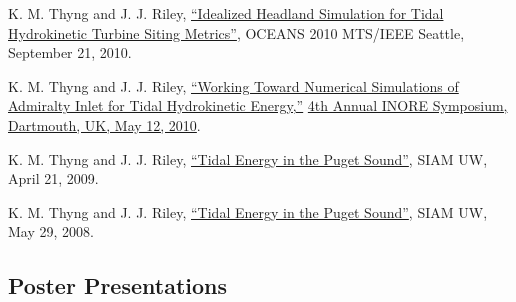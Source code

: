 \documentclass[10pt,letterpaper]{article}
\renewenvironment{itemize}{
  \begin{list}{}{
    \setlength{\leftmargin}{1.5em}
    \setlength{\itemsep}{0.25em}
    \setlength{\parskip}{0pt}
    \setlength{\parsep}{0.25em}
  }
}{
  \end{list}
}
\begin{document}
\begin{itemize}
\item K. M. Thyng and J. J. Riley, \href{http://froude.me.washington.edu/presentations/oceans2010/oceans2010.pdf}{``Idealized Headland Simulation for Tidal Hydrokinetic Turbine Siting Metrics''}, OCEANS 2010 MTS/IEEE Seattle, September 21, 2010.

\item K. M. Thyng and J. J. Riley, \href{http://froude.me.washington.edu/presentations/inore2010/inore2010.pdf}{``Working Toward Numerical Simulations of Admiralty Inlet for Tidal Hydrokinetic Energy,''} \href{http://inore.org/}{4th Annual INORE Symposium, Dartmouth, UK, May 12, 2010}.

\item K. M. Thyng and J. J. Riley, \href{http://froude.me.washington.edu/presentations/SIAM-4-21-09.pdf}{``Tidal Energy in the Puget Sound''}, SIAM UW, April 21, 2009.

\item K. M. Thyng and J. J. Riley, \href{http://froude.me.washington.edu/presentations/SIAM-5-29-08.pdf}{``Tidal Energy in the Puget Sound''}, SIAM UW, May 29, 2008.

%
%

\end{itemize}

\subsection*{Poster Presentations}
\end{document}

